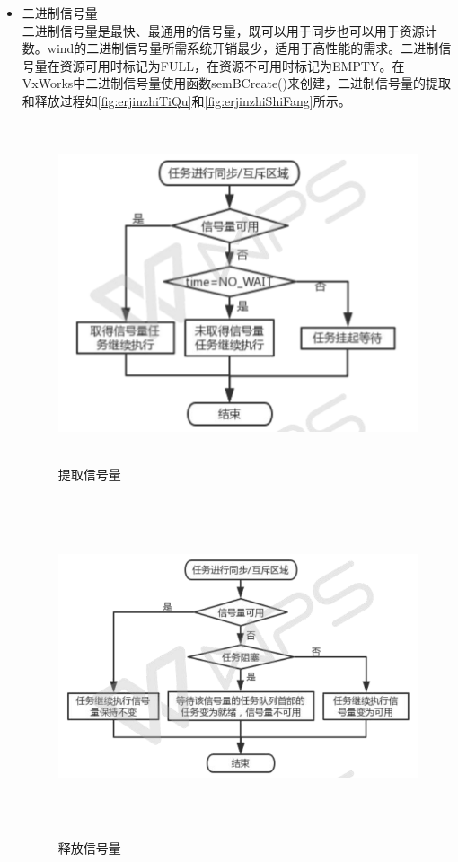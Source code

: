 \begin{itemize}
\item 二进制信号量\\
	二进制信号量是最快、最通用的信号量，既可以用于同步也可以用于资源计数。wind的二进制信号量所需系统开销最少，适用于高性能的需求。二进制信号量在资源可用时标记为FULL，在资源不可用时标记为EMPTY。在VxWorks中二进制信号量使用函数semBCreate()来创建，二进制信号量的提取和释放过程如\autoref{fig:erjinzhiTiQu}和\autoref{fig:erjinzhiShiFang}所示。

\begin{figure}[!h]
\centering
\includegraphics[width=13cm , height=10cm]{./graphics/erjinzhiTiQu.pdf}
  \caption{提取信号量}\label{fig:erjinzhiTiQu}
\end{figure}

\begin{figure}[!h]
\centering
\includegraphics[width=13cm , height=10cm]{./graphics/erjinzhiShiFang.pdf}
  \caption{释放信号量}\label{fig:erjinzhiShiFang}
\end{figure}



\end{itemize}
